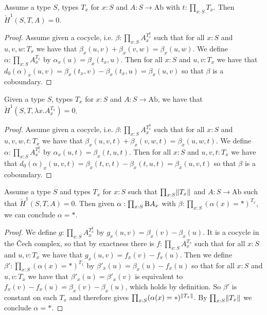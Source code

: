 \begin{lemma}\label{section-exact-cech-complex}
Assume a type $S$, types $T_x$ for $x:S$ and $A:S\to\mathrm{Ab}$ with $t:\prod_{x:S}T_x$. Then $\check{H}^1(S,T,A)=0$.
\end{lemma}

\begin{proof}
Assume given a cocycle, i.e. $\beta:\prod_{x:S}A_x^{T_x^2}$ such that for all $x:S$ and $u,v,w:T_x$ we have that $\beta_x(u,v)+\beta_x(v,w) = \beta_x(u,w)$. We define $\alpha:\prod_{x:S}A_x^{T_x}$ by $\alpha_x(u) = \beta_x(t_x,u)$. Then for all $x:S$ and $u,v:T_x$ we have that $d_0(\alpha)_x(u,v) =  \beta_x(t_x,v) - \beta_x(t_x,u) = \beta_x(u,v)$ so that $\beta$ is a coboundary.
\end{proof}

\begin{lemma}\label{canonical-exact-cech-complex}
Given a type $S$, types $T_x$ for $x:S$ and $A:S\to\mathrm{Ab}$, we have that $\check{H}^1(S,T,\lambda x.A_x^{T_x})=0$.
\end{lemma}

\begin{proof}
Assume given a cocycle, i.e. $\beta:\prod_{x:S}A_x^{T_x^3}$ such that for all $x:S$ and $u,v,w,t:T_x$ we have that $\beta_x(u,v,t)+\beta_x(v,w,t) = \beta_x(u,w,t)$. We define $\alpha:\prod_{x:S}A_x^{T_x^2}$ by $\alpha_x(u,t) = \beta_x(t,u,t)$. Then for all $x:S$ and $u,v,t:T_x$ we have that $d_0(\alpha)_x(u,v,t) = \beta_x(t,v,t) - \beta_x(t,u,t) = \beta_x(u,v,t)$ so that $\beta$ is a coboundary.
\end{proof}

\begin{lemma}\label{exact-cech-complex-vanishing-cohomology}
Assume a type $S$ and types $T_x$ for $x:S$ such that $\prod_{x:S}\lVert T_x \rVert$ and $A:S\to\mathrm{Ab}$ such that $\check{H}^1(S,T,A) = 0$.
Then given $\alpha:\prod_{x:S}\mathrm{B} A_x$ with $\beta:\prod_{x:S} (\alpha(x) = *)^{T_x}$, we can conclude $\alpha = *$.
\end{lemma}

\begin{proof}
We define $g : \prod_{x:S} A_x^{T_x^2}$ by $g_x(u,v) = \beta_x(v) - \beta_x(u)$.
It is a cocycle in the \v{C}ech complex, so that by exactness there is $f:\prod_{x:S}A_x^{T_x}$ such that for all $x:S$ and $u,v:T_x$ we have that $g_x(u,v)= f_x(v) - f_x(u)$.
Then we define $\beta' : \prod_{x:S}(\alpha(x)=*)^{T_x}$ by $\beta'_x(u) = \beta_x(u) - f_x(u)$
so that for all $x:S$ and $u,v:T_x$ we have that $\beta'_x(u) = \beta'_x(v)$ is equivalent to $f_x(v) - f_x(u) = \beta_x(v) - \beta_x(u)$, which holds by definition. So $\beta'$ is constant on each $T_x$ and therefore gives $\prod_{x:S} (\alpha(x)=*)^{\lVert T_x \rVert}$. By $\prod_{x:S}\lVert T_x \rVert$ we conclude $\alpha = *$.
\end{proof}


